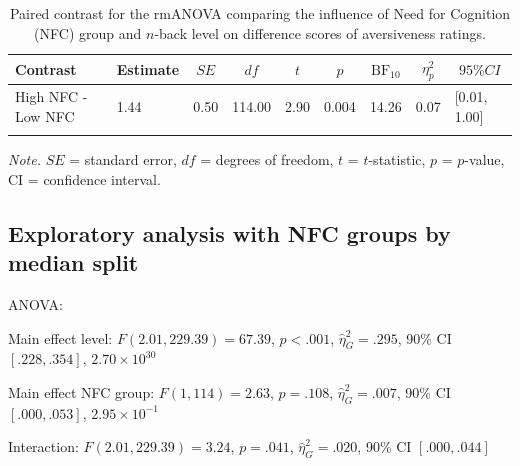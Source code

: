 \documentclass[
  man,floatsintext]{apa6}
\begin{document}
\begin{table}[H]

\begin{center}
\begin{threeparttable}

\caption{\label{tab:unnamed-chunk-15}Paired contrast for the rmANOVA comparing the influence of Need for Cognition (NFC) group and $n$-back level on difference scores of aversiveness ratings.}

\begin{tabular}{lllllllll}
\toprule
Contrast & \multicolumn{1}{c}{Estimate} & \multicolumn{1}{c}{$SE$} & \multicolumn{1}{c}{$df$} & \multicolumn{1}{c}{$t$} & \multicolumn{1}{c}{$p$} & \multicolumn{1}{c}{$\mathrm{BF}_{\textrm{10}}$} & \multicolumn{1}{c}{$\eta_{p}^{2}$} & \multicolumn{1}{c}{$95\% CI$}\\
\midrule
High NFC - Low NFC & 1.44 & 0.50 & 114.00 & 2.90 & 0.004 & 14.26 & 0.07 & {}[0.01, 1.00]\\
\bottomrule
\addlinespace
\end{tabular}

\begin{tablenotes}[para]
\normalsize{\textit{Note.} $SE$ = standard error, $df$ = degrees of freedom, $t$ = $t$-statistic, $p$ = $p$-value, CI = confidence interval.}
\end{tablenotes}

\end{threeparttable}
\end{center}

\end{table}

\newpage

\hypertarget{exploratory-analysis-with-nfc-groups-by-median-split}{%
\subsection{Exploratory analysis with NFC groups by median split}\label{exploratory-analysis-with-nfc-groups-by-median-split}}

ANOVA:

Main effect level: \(F(2.01, 229.39) = 67.39\), \(p < .001\), \(\hat{\eta}^2_G = .295\), 90\% CI \([.228, .354]\), \(2.70 \times 10^{30}\)

Main effect NFC group: \(F(1, 114) = 2.63\), \(p = .108\), \(\hat{\eta}^2_G = .007\), 90\% CI \([.000, .053]\), \(2.95 \times 10^{-1}\)

Interaction: \(F(2.01, 229.39) = 3.24\), \(p = .041\), \(\hat{\eta}^2_G = .020\), 90\% CI \([.000, .044]\)
\end{document}
